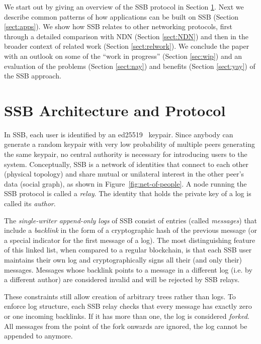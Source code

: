 \documentclass[9pt,sigconf]{acmart}
\begin{document}
We start out by giving an overview of the SSB protocol in Section
\ref{sect:architecture}. Next we describe common patterns of how
applications can be built on SSB (Section \ref{sect:apps}). We show
how SSB relates to other networking protocols, first through a
detailed comparison with NDN (Section \ref{sect:NDN}) and then in the
broader context of related work (Section \ref{sect:relwork}). We
conclude the paper with an outlook on some of the ``work in progress''
(Section \ref{sec:wip}) and an evaluation of the problems (Section
\ref{sect:nay}) and benefits (Section \ref{sect:yay}) of the SSB
approach.



\section{SSB Architecture and Protocol}
\label{sect:architecture}

In SSB, each user is identified by an ed25519~\cite{bernstein2012high}
keypair. Since anybody can generate a random keypair with very low
probability of multiple peers generating the same keypair, no central
authority is necessary for introducing users to the
system. Conceptually, SSB is a network of identities that connect to
each other (physical topology) and share mutual or unilateral interest
in the other peer's data (social graph), as shown in
Figure~\ref{fig:net-of-people}. A node running the SSB protocol is
called a \textit{relay}. The identity that holds the private key of a
log is called its \textit{author}.

The {\em single-writer append-only logs} of SSB consist of entries
(called \textit{messages}) that include a {\em backlink} in the form
of a cryptographic hash of the previous message (or a special
indicator for the first message of a log). The most distinguishing
feature of this linked list, when compared to a regular blockchain, is
that each SSB user maintains their own log and cryptographically signs
all their (and only their) messages. Messages whose backlink points to
a message in a different log (i.e. by a different author) are
considered invalid and will be rejected by SSB relays.

These constraints still allow creation of arbitrary trees rather than
logs. To enforce log structure, each SSB relay checks that every
message has exactly zero or one incoming backlinks. If it has more
than one, the log is considered {\em forked}. All messages from the
point of the fork onwards are ignored, the log cannot be appended to
anymore.
\end{document}

